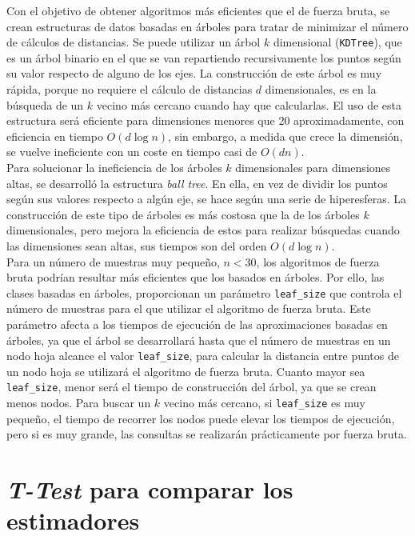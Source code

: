 \documentclass[12pt,a4paper]{report} %
\theoremstyle{definition}
\begin{document}
Con el objetivo de obtener algoritmos más eficientes que el de fuerza bruta, se crean estructuras de datos basadas en árboles para tratar de minimizar el número de cálculos de distancias. Se puede utilizar un árbol $k$ dimensional (\texttt{KDTree}), que es un árbol binario en el que se van repartiendo recursivamente los puntos según su valor respecto de alguno de los ejes. La construcción de este árbol es muy rápida, porque no requiere el cálculo de distancias $d$ dimensionales, es en la búsqueda de un $k$ vecino más cercano cuando hay que calcularlas. El uso de esta estructura será eficiente para dimensiones menores que 20 aproximadamente, con eficiencia en tiempo $O(d\log n)$, sin embargo, a medida que crece la dimensión, se vuelve ineficiente con un coste en tiempo casi de $O(dn)$.\\

Para solucionar la ineficiencia de los árboles $k$ dimensionales para dimensiones altas, se desarrolló la estructura \textit{ball tree}. En ella, en vez de dividir los puntos según sus valores respecto a algún eje, se hace según una serie de hiperesferas. La construcción de este tipo de árboles es más costosa que la de los árboles $k$ dimensionales, pero mejora la eficiencia de estos para realizar búsquedas cuando las dimensiones sean altas, sus tiempos son del orden $O(d\log n)$.\\

Para un número de muestras muy pequeño, $n<30$, los algoritmos de fuerza bruta podrían resultar más eficientes que los basados en árboles. Por ello, las clases basadas en árboles, proporcionan un parámetro \texttt{leaf\_size} que controla el número de muestras para el que utilizar el algoritmo de fuerza bruta. Este parámetro afecta a los tiempos de ejecución de las aproximaciones basadas en árboles, ya que el árbol se desarrollará hasta que el número de muestras  en un nodo hoja alcance el valor \texttt{leaf\_size}, para calcular la distancia entre puntos de un nodo hoja se utilizará el algoritmo de fuerza bruta. Cuanto mayor sea \texttt{leaf\_size}, menor será el tiempo de construcción del árbol, ya que se crean menos nodos. Para buscar un $k$ vecino más cercano, si \texttt{leaf\_size} es muy pequeño, el tiempo de recorrer los nodos puede elevar los tiempos de ejecución, pero si es muy grande, las consultas se realizarán prácticamente por fuerza bruta.\\

\section{\textit{T-Test} para comparar los estimadores}
\end{document}
